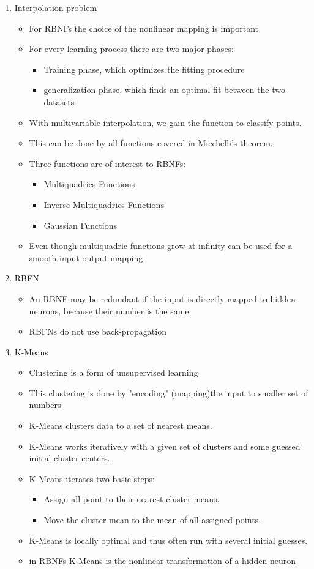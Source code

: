 \documentclass{scrartcl}
\begin{document}
\begin{enumerate}
\item Interpolation problem
	\begin{itemize}
	\item For RBNFs the choice of the nonlinear mapping is important
	\item For every learning process there are two major phases:
		\begin{itemize}
		\item Training phase, which optimizes the fitting procedure
		\item generalization phase, which finds an optimal fit between the two datasets
		\end{itemize}
	\item With multivariable interpolation, we gain the function to classify points.
	\item This can be done by all functions covered in Micchelli's theorem.
	\item Three functions are of interest to RBNFs:
		\begin{itemize}
		\item Multiquadrics Functions
		\item Inverse Multiquadrics Functions
		\item Gaussian Functions 
		\end{itemize}
	\item  Even though multiquadric functions grow at infinity can be used for a smooth input-output mapping
	\end{itemize}
	
\item RBFN
	\begin{itemize}
	\item An RBNF may be redundant if the input is directly mapped to hidden neurons, because their number is the same.
	\item RBFNs do not use back-propagation
	\end{itemize}
	
\item K-Means
	\begin{itemize}
	\item Clustering is a form of unsupervised learning
	\item This clustering is done by "encoding" (mapping)the input to smaller set of numbers
	\item K-Means clusters data to a set of nearest means.
	\item K-Means works iteratively with a given set of clusters and some guessed initial cluster centers.
	\item K-Means iterates two basic steps:
		\begin{itemize}
		\item Assign all point to their nearest cluster means.
		\item Move the cluster mean to the mean of all assigned points.
		\end{itemize}
	\item K-Means is locally optimal and thus often run with several initial guesses.
	\item in RBNFs K-Means is the nonlinear transformation of a hidden neuron
	\end{itemize}
	

\end{enumerate}
\end{document}
